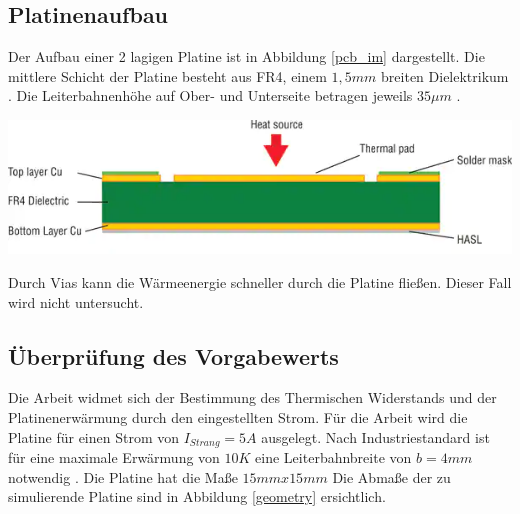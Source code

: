 \documentclass[10pt,a4paper,oneside,abstracton]{scrartcl}
\newenvironment{Figure}
  {\par\medskip\noindent\minipage{\linewidth}}
  {\endminipage\par\medskip}
\begin{document}
\begin{multicols}{2}
\subsection{Platinenaufbau}
Der Aufbau einer 2 lagigen Platine ist in Abbildung \ref*{pcb_im} dargestellt. 
\newline
Die mittlere Schicht der Platine besteht aus FR4, einem $ 1,5mm $ breiten Dielektrikum \cite{PCB_Querschnitt}. 
Die Leiterbahnenhöhe auf Ober- und Unterseite betragen jeweils $ 35 \mu m$ \cite{aisler}.
\begin{Figure}
	\includegraphics[width=\textwidth]{Bilder/PCB_Querschnitt.png}
	\label{pcb_im}
\end{Figure}

\noindent
Durch Vias kann die Wärmeenergie schneller durch die Platine fließen. 
Dieser Fall wird nicht untersucht.

\noindent



\subsection{Überprüfung des Vorgabewerts}
Die Arbeit widmet sich der Bestimmung des Thermischen Widerstands und der 
Platinenerwärmung durch den eingestellten Strom. 
\newline
Für die Arbeit wird die Platine für einen Strom von $I_{Strang} = 5 A $ ausgelegt. 
\newline
Nach Industriestandard ist für eine maximale Erwärmung von $10 K$ eine Leiterbahnbreite von $b = 4 mm $ notwendig \cite{ipc}. 
Die Platine hat die Maße $15mm x 15mm$
Die Abmaße der zu simulierende Platine sind in Abbildung \ref*{geometry} ersichtlich.



\end{multicols}
\end{document}
